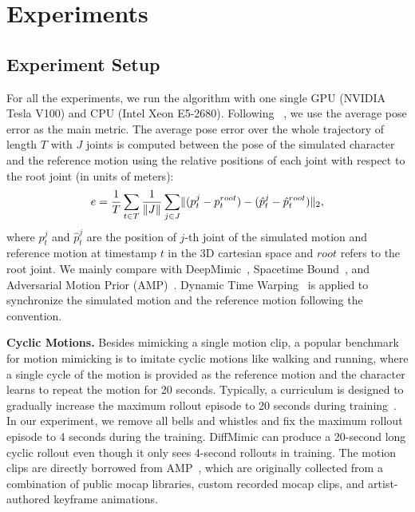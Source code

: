 \section{Experiments}
\subsection{Experiment Setup}
For all the experiments, we run the algorithm with one single GPU (NVIDIA Tesla V100) and CPU (Intel Xeon E5-2680). 
Following ~\citet{peng2021amp}, we use the average pose error as the main metric. The average pose error over the whole trajectory of length $T$ with $J$ joints is computed between the pose of the simulated character and the reference motion using the relative positions of each joint with respect to the root joint (in units of meters):
\begin{equation}
\small
    e = \frac{1}{T} \sum_{t\in T} \frac{1}{\lVert J \rVert} \sum_{j \in J} \lVert (p^j_t - p_t^{root}) - (\hat{p}^j_t - \hat{p}_t^{root}) \rVert_2, 
\end{equation}
where $p^j_t$ and $\hat{p}^j_t$ are the position of $j$-th joint of the simulated motion and reference motion at timestamp $t$ in the 3D cartesian space and $root$ refers to the root joint. 
We mainly compare with DeepMimic~\citep{peng2018deepmimic}, Spacetime Bound~\citep{ma2021learning}, and Adversarial Motion Prior (AMP)~\citep{peng2021amp}. Dynamic Time Warping~\citep{sakoe1978dynamic} is applied to synchronize the simulated motion and the reference motion following the convention.

\textbf{Cyclic Motions.} Besides mimicking a single motion clip, a popular benchmark for motion mimicking is to imitate cyclic motions like walking and running, where a single cycle of the motion is provided as the reference motion and the character learns to repeat the motion for 20 seconds. 
Typically, a curriculum is designed to gradually increase the maximum rollout episode to 20 seconds during training~\citep{yang2021efficient, peng2018deepmimic}. In our experiment, we remove all bells and whistles and fix the maximum rollout episode to 4 seconds during the training. DiffMimic can produce a 20-second long cyclic rollout even though it only sees 4-second rollouts in training. {The motion clips are directly borrowed from AMP~\citep{peng2021amp}, which are originally collected from a combination of public mocap libraries, custom recorded mocap clips, and artist-authored keyframe animations.}


